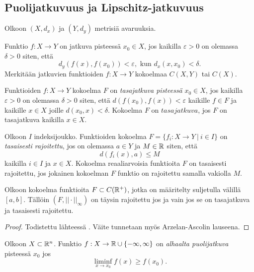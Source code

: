 \documentclass[12pt,oneside,a4paper]{amsbook} %
\begin{document}
\subsection{Puolijatkuvuus ja Lipschitz-jatkuvuus}
Olkoon $(X, d_x)$ ja $(Y, d_y)$ metrisiä avaruuksia.

\begin{definition}Funktio $f: X \to Y$ on jatkuva pisteessä $x_0 \in X$, jos kaikilla $\varepsilon > 0$ on olemassa $\delta > 0$ siten, että
\begin{equation*}
    d_y(f(x), f(x_0)) < \varepsilon, \text{ kun } d_x(x, x_0) < \delta.
\end{equation*}
Merkitään jatkuvien funktioiden $f: X \to Y$ kokoelmaa $C(X, Y)$ tai $C(X)$.
\end{definition}

\begin{definition}
Funktioiden $f:X \to Y$ kokoelma $F$ on \textit{tasajatkuva pisteessä} $x_0 \in X$, jos kaikilla $\varepsilon > 0 $ on olemassa $\delta > 0$ siten, että $d(f(x_0), f(x)) < \varepsilon$ kaikille $f \in F$ ja kaikille $x \in X$ joille $d(x_0, x) < \delta $. Kokoelma $F$ on $tasajatkuva$, jos $F$ on tasajatkuva kaikilla $x \in X$.
\end{definition}

\begin{definition}
    Olkoon $I$ indeksijoukko. Funktioiden kokoelma $F = \{f_i : X \to Y \ | \ i \in I\}$ on \textit{tasaisesti rajoitettu}, jos on olemassa $a \in Y$ ja $M \in \mathbb{R}$ siten, että
    \begin{equation*}
        d(f_i(x), a) \le M
    \end{equation*} 
    kaikilla $i \in I$ ja $x \in X$.
    Kokoelma reaaliarvoisia funktioita $F$ on tasaisesti rajoitettu, jos jokainen kokoelman $F$ funktio on rajoitettu samalla vakiolla $M$.
\end{definition}

\begin{theorem}\label{thm:ascoli-arzela}
    Olkoon kokoelma funktioita $F \subset C({\mathbb{R}^{+}})$, jotka on määritelty suljetulla välillä $[a, b]$. Tällöin $(F, ||\cdot||_\infty)$ on täysin rajoitettu jos ja vain jos se on tasajatkuva ja tasaisesti rajoitettu.
\end{theorem}
\begin{proof}
    Todistettu lähteessä \cite[s. 158]{rudin}. Väite tunnetaan myös Arzelan-Ascolin lauseena.
\end{proof}

\begin{definition}
    Olkoon $X\subset \mathbb{R}^n$. Funktio $f: X \to \mathbb{R} \cup\{-\infty, \infty\}$ on \textit{alhaalta puolijatkuva} pisteessä $x_0$ jos 
    $$\liminf_{x\to x_0}  f(x) \ge f(x_0).$$
\end{definition}
\end{document}
